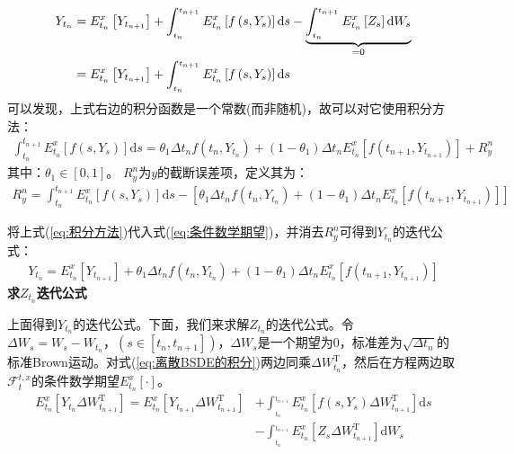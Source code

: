 					\begin{align}\label{eq:条件数学期望}
					{Y_{{t_n}}} &= E_{{t_n}}^x\left[ {{Y_{{t_{n + 1}}}}} \right] + \int_{_{{t_n}}}^{_{{t_{n + 1}}}} {E_{{t_n}}^x\left[ {f\left( {s,{Y_s}} \right)} \right]\mathrm{d}s - \underbrace {\int_{_{{t_n}}}^{_{{t_{n + 1}}}} {E_{{t_n}}^x\left[ {{Z_s}} \right]\mathrm{d}{W_s}} }_{ = 0}} \notag \\
					&= E_{{t_n}}^x\left[ {{Y_{{t_{n + 1}}}}} \right] + \int_{_{{t_n}}}^{_{{t_{n + 1}}}} {E_{{t_n}}^x\left[ {f\left( {s,{Y_s}} \right)} \right]\mathrm{d}s}
					\end{align}
			可以发现，上式右边的积分函数是一个常数(而非随机)，故可以对它使用积分方法：
					\begin{align}\label{eq:积分方法}
					\int_{{t_n}}^{{t_{n + 1}}} {E_{{t_n}}^x\left[ {f\left( {s,{Y_s}} \right)} \right]\mathrm{d}s = {\theta _1}\Delta {t_n}f\left( {{t_n},{Y_{{t_n}}}} \right) + \left( {1 - {\theta _1}} \right)\Delta {t_n}E_{{t_n}}^x\left[ {f\left( {{t_{n + 1}},{Y_{{t_{n + 1}}}}} \right)} \right] + R_y^n}
					\end{align}
			其中：$\theta_1 \in [0,1]$。
			$R_y^n$为$y$的截断误差项，定义其为：
			\begin{align*}
			R_y^n = \int_{{t_n}}^{{t_{n + 1}}} {E_{{t_n}}^x\left[ {f\left( {s,{Y_s}} \right)} \right]\mathrm{d}s - \left[ {{\theta _1}\Delta {t_n}f\left( {{t_n},{Y_{{t_n}}}} \right) + \left( {1 - {\theta _1}} \right)\Delta {t_n}E_{{t_n}}^x\left[ {f\left( {{t_{n + 1}},{Y_{{t_{n + 1}}}}} \right)} \right]} \right]} \end{align*}
			\par
			将上式(\ref{eq:积分方法})代入式(\ref{eq:条件数学期望})，并消去$R_y^n$可得到$Y_{t_n}$的迭代公式：
			\begin{align*}
			{Y_{{t_n}}} = E_{{t_n}}^x\left[ {{Y_{{t_{n + 1}}}}} \right] + {\theta _1}\Delta {t_n}f\left( {{t_n},{Y_{{t_n}}}} \right) + \left( {1 - {\theta _1}} \right)\Delta {t_n}E_{{t_n}}^x\left[ {f\left( {{t_{n + 1}},{Y_{{t_{n + 1}}}}} \right)} \right]\end{align*}
			\checkmark \textbf{求$Z_{t_n}$迭代公式}
			\par
			上面得到$Y_{t_n}$的迭代公式。下面，我们来求解$Z_{t_n}$的迭代公式。令$\Delta {W_s} = {W_s} - {W_{{t_n}}}，(s \in [t_n,t_{n+1}])$，$\Delta {W_s}$是一个期望为0，标准差为$\sqrt {\Delta {t_n}} $的标准Brown运动。对式(\ref{eq:离散BSDE的积分})两边同乘$\Delta {W_{t_n}^\mathrm{T}}$，然后在方程两边取${{\mathcal{F}}_t^{t,x}}$的条件数学期望$ E_{{t_n}}^x\left[ \cdot \right]$。
					\begin{equation*}
					\begin{split}
					E_{{t_n}}^x\left[ {{Y_{{t_n}}} \Delta W_{{t_{n + 1}}}^\mathrm{T}} \right] = E_{{t_n}}^x\left[ {{Y_{{t_{n + 1}}}}  \Delta W_{{t_{n + 1}}}^\mathrm{T}} \right] & + \int_{_{{t_n}}}^{_{{t_{n + 1}}}} {E_{{t_n}}^x\left[ {f\left( {s,{Y_s}} \right)\Delta W_{{t_{n + 1}}}^\mathrm{T}} \right]\mathrm{d}s}\\  &- \int_{_{{t_n}}}^{_{{t_{n + 1}}}} {E_{{t_n}}^x\left[ {{Z_s} \Delta W_{{t_{n + 1}}}^\mathrm{T}} \right]\mathrm{d}{W_s}}
					\end{split}
					\end{equation*}
